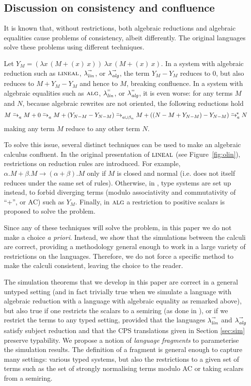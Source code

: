 \documentclass{LMCS}
\newcommand{\olin}{\mbox{\sc lineal}}
\newcommand{\oalg}{\mbox{\sc alg}}
\newcommand{\xllin}[1]{\ensuremath{\lambda^{\raisebox{0.5ex}{\textrm{\tiny $#1$}}}_{{\it lin}}}}
\newcommand{\xlalg}[1]{\ensuremath{\lambda^{\raisebox{0.5ex}{\textrm{\tiny $#1$}}}_{{\it alg}}}}
\newcommand{\llinred}{\xllin{\rightarrow}}
\newcommand{\lalgred}{\xlalg{\rightarrow}}
\newcommand{\llineq}{\xllin{=}}
\newcommand{\lalgeq}{\xlalg{=}}
\newcommand{\simxto}[1]{\ensuremath{\rightarrow_{#1}^{\hspace{-2.2ex}\textrm{\tiny=}}}}
\newcommand{\ssimxto}[1]{\ensuremath{\rightarrow_{#1}^{\hspace{-2.2ex}\textrm{\tiny=}\ *}}}
\newcommand{\toalgeq}{\simxto{a}}
\newcommand{\tobalgeq}{\simxto{a\cup\beta_n}}
\newcommand{\stoalgeq}{\ensuremath{\ssimxto{a}}}
\begin{document}
\subsection{Discussion on consistency and confluence}\label{sec:consistency}

It is known that, without restrictions, both algebraic reductions and
algebraic equalities cause problems of consistency, albeit
differently. The original languages solve these problems using
different techniques.

Let $Y_M=(\lambda x\,(M+(x)~x))~\lambda x\,(M+(x)~x)$. In a system
with algebraic reduction such as $\olin$, $\llinred$, or $\lalgred$, the term
$Y_M-Y_M$ reduces to $0$, but also reduces to $M+Y_M-Y_M$ and hence to
$M$, breaking confluence.  In a system with algebraic equalities such
as $\oalg$, $\llineq$, or $\lalgeq$, it
is even worse: for any terms $M$ and $N$, because algebraic
rewrites are not oriented, the following reductions hold
\[
  M \toalgeq M+0
  \toalgeq  M+(Y_{N-M}-Y_{N-M})
  \tobalgeq  M+((N-M+Y_{N-M})-Y_{N-M})
  \stoalgeq  N
\]
making any term $M$ reduce to any other term $N$.


To solve this issue, several distinct techniques can be used to make
an algebraic calculus confluent. In the original presentation of
$\olin$ (see Figure~\ref{fig:olin}), restrictions on reduction rules
are introduced.  For example, $\alpha.M+\beta.M\to (\alpha+\beta).M$
only if $M$ is closed and normal (i.e. does not itself reduces under
the same set of rules). Otherwise, in
\cite{ArrighiDiazcaroQPL09,ArrighiDiazcaroValironDCM11,BuirasDiazcaroJaskelioffLSFA11,ValironDCM10,ValironQPL10},
type systems are set up instead, to forbid diverging terms (modulo
associativity and commutativity of ``+'', or AC) such as $Y_M$.
Finally, in
$\oalg$ \cite{VauxMSCS09} a restriction to positive scalars is proposed to solve the
problem. 

Since any of these techniques will solve the problem, in this paper we do not make a choice {\em a priori}. Instead, we show
that the  simulations between the calculi are correct,
providing a methodology general enough to work in a large variety of
restrictions on the languages.
Therefore, we do not force a specific method to make the
calculi consistent, leaving the choice to the reader.

The simulation theorems that we develop in this paper are correct in
a general untyped setting (and in fact trivially true when we simulate
a language with algebraic reduction with a language with algebraic
equality as remarked above),
but also true if one restricts the scalars to a semiring (as done in
\cite{VauxMSCS09}), 
or if we restrict the terms to any typed setting,
provided that the languages $\llinred$ and $\lalgred$ satisfy
subject reduction 
and that the CPS translations given in Section \ref{sec:sim} preserve typability.
We propose a notion of {\em language
fragments} to parameterise the simulation results. The definition of a
fragment is general enough to capture many settings: various typed
systems, but also the restrictions to a given set of terms such as the set
of strongly normalising terms modulo AC
or taking scalars from a semiring.
\end{document}
